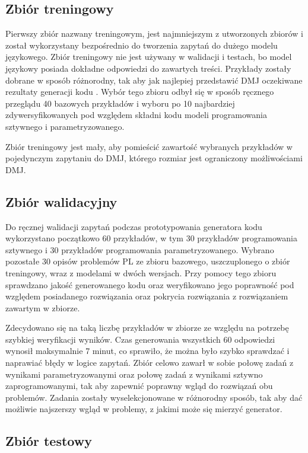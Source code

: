 \subsection{Zbiór treningowy}

Pierwszy zbiór nazwany treningowym, jest najmniejszym z utworzonych zbiorów i został wykorzystany bezpośrednio do tworzenia zapytań do dużego modelu językowego. Zbiór treningowy nie jest używany w walidacji i testach, bo model językowy posiada dokładne odpowiedzi do zawartych treści. Przykłady zostały dobrane w sposób różnorodny, tak aby jak najlepiej przedstawić DMJ oczekiwane rezultaty generacji kodu . Wybór tego zbioru odbył się w sposób ręcznego przeglądu 40 bazowych przykładów i wyboru po 10 najbardziej zdywersyfikowanych pod względem składni kodu  modeli programowania sztywnego i parametryzowanego.

Zbiór treningowy jest mały, aby pomieścić zawartość wybranych przykładów w pojedynczym zapytaniu do DMJ, którego rozmiar jest ograniczony możliwościami DMJ.

\subsection{Zbiór walidacyjny}

Do ręcznej walidacji zapytań podczas prototypowania generatora kodu   wykorzystano początkowo 60 przykładów, w tym 30 przykładów programowania sztywnego i 30 przykładów programowania parametryzowanego. Wybrano pozostałe 30 opisów problemów PL ze zbioru bazowego, uszczuplonego o zbiór treningowy, wraz z modelami  w dwóch wersjach. Przy pomocy tego zbioru sprawdzano jakość generowanego kodu   oraz weryfikowano jego poprawność pod względem posiadanego rozwiązania oraz pokrycia rozwiązania z rozwiązaniem zawartym w zbiorze.

Zdecydowano się na taką liczbę przykładów w zbiorze ze względu na potrzebę szybkiej weryfikacji wyników. Czas generowania wszystkich 60 odpowiedzi wynosił maksymalnie 7 minut, co sprawiło, że można było szybko sprawdzać i naprawiać błędy w logice zapytań. Zbiór celowo zawarł w sobie połowę zadań z wynikami parametryzowanymi oraz połowę zadań z wynikami sztywno zaprogramowanymi, tak aby zapewnić poprawny wgląd do rozwiązań obu problemów. Zadania zostały wyselekcjonowane w różnorodny sposób, tak aby dać możliwie najszerszy wgląd w problemy, z jakimi może się mierzyć generator.

\subsection{Zbiór testowy}


